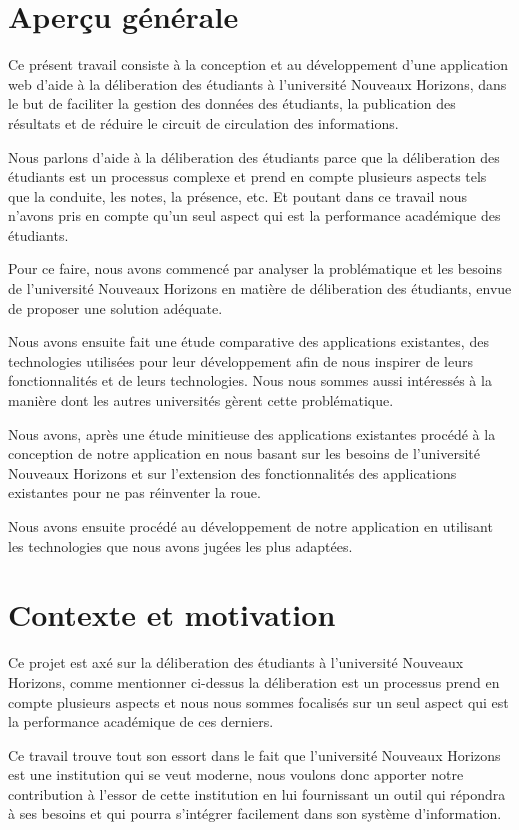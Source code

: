 \section{Aperçu générale}\label{sec:apercu-generale}
Ce présent travail consiste à la conception et au développement d'une application web
d'aide à la déliberation des étudiants à l'université Nouveaux Horizons, dans le but
de faciliter la gestion des données des étudiants, la publication des résultats et
de réduire le circuit de circulation des informations.

Nous parlons d'aide à la déliberation des étudiants parce que la déliberation des étudiants
est un processus complexe et prend en compte plusieurs aspects tels que la conduite, les notes,
la présence, etc. Et poutant dans ce travail nous n'avons pris en compte qu'un
seul aspect qui est la performance académique des étudiants.

Pour ce faire, nous avons commencé par analyser la problématique et les besoins
de l'université Nouveaux Horizons en matière de déliberation des étudiants, envue de
proposer une solution adéquate.

Nous avons ensuite fait une étude comparative des applications existantes, des technologies
utilisées pour leur développement afin de nous inspirer de leurs fonctionnalités et de leurs technologies.
Nous nous sommes aussi intéressés à la manière dont les autres universités gèrent cette problématique.

Nous avons, après une étude minitieuse des applications existantes procédé à la conception
de notre application en nous basant sur les besoins de l'université Nouveaux Horizons et sur
l'extension des fonctionnalités des applications existantes pour ne pas réinventer la roue.

Nous avons ensuite procédé au développement de notre application en utilisant
les technologies que nous avons jugées les plus adaptées.

\section{Contexte et motivation}\label{sec:contexte-et-motivation}
Ce projet est axé sur la déliberation des étudiants à l'université Nouveaux Horizons,
comme mentionner ci-dessus la déliberation est un processus prend en compte plusieurs aspects
et nous nous sommes focalisés sur un seul aspect qui est la performance académique de ces derniers.


Ce travail trouve tout son essort dans le fait que l'université Nouveaux Horizons est une institution
qui se veut moderne, nous voulons donc apporter notre contribution à l'essor de cette institution
en lui fournissant un outil qui répondra à ses besoins et qui pourra s'intégrer facilement dans son système d'information.

